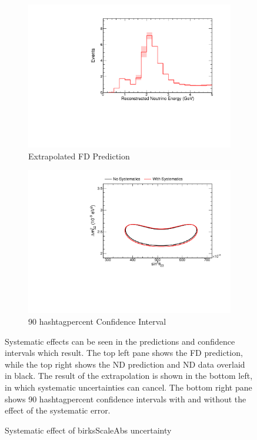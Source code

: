 {\begin{figure}
\begin{center}
\begin{subfigure}[c]{0.49\textwidth}
\includegraphics[width=\textwidth]{figures/systs/prediction/fd_extrap_prediction_birksScaleAbs.pdf}
\caption*{Extrapolated FD Prediction}
\end{subfigure}
\begin{subfigure}[c]{0.49\textwidth}
\includegraphics[width=\textwidth]{figures/systs/prediction/fd_extrap_contour_birksScaleAbs.pdf}
\caption*{90 hashtagpercent Confidence Interval}
\end{subfigure}
\end{center}
\caption{Systematic effect of birksScaleAbs uncertainty}{
Systematic effects can be seen in the predictions and confidence intervals
which result.
The top left pane shows the FD prediction, while the top right shows the
ND prediction and ND data overlaid in black.
The result of the extrapolation is shown in the bottom left, in which
systematic uncertainties can cancel.
The bottom right pane shows 90 hashtagpercent confidence intervals with and without
the effect of the systematic error.}
\label{syst_fig_birksScaleAbs}


\end{figure}}
